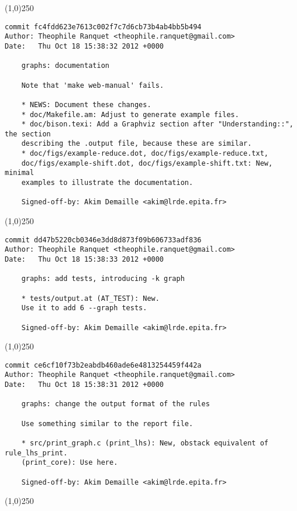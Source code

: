 \line(1,0){250}
\begin{verbatim}
commit fc4fdd623e7613c002f7c7d6cb73b4ab4bb5b494
Author: Theophile Ranquet <theophile.ranquet@gmail.com>
Date:   Thu Oct 18 15:38:32 2012 +0000

    graphs: documentation
    
    Note that 'make web-manual' fails.
    
    * NEWS: Document these changes.
    * doc/Makefile.am: Adjust to generate example files.
    * doc/bison.texi: Add a Graphviz section after "Understanding::", the section
    describing the .output file, because these are similar.
    * doc/figs/example-reduce.dot, doc/figs/example-reduce.txt,
    doc/figs/example-shift.dot, doc/figs/example-shift.txt: New, minimal
    examples to illustrate the documentation.
    
    Signed-off-by: Akim Demaille <akim@lrde.epita.fr>

\end{verbatim}
\line(1,0){250}
\begin{verbatim}
commit dd47b5220cb0346e3dd8d873f09b606733adf836
Author: Theophile Ranquet <theophile.ranquet@gmail.com>
Date:   Thu Oct 18 15:38:33 2012 +0000

    graphs: add tests, introducing -k graph
    
    * tests/output.at (AT_TEST): New.
    Use it to add 6 --graph tests.
    
    Signed-off-by: Akim Demaille <akim@lrde.epita.fr>

\end{verbatim}
\line(1,0){250}
\begin{verbatim}
commit ce6cf10f73b2eabdb460ade6e4813254459f442a
Author: Theophile Ranquet <theophile.ranquet@gmail.com>
Date:   Thu Oct 18 15:38:31 2012 +0000

    graphs: change the output format of the rules
    
    Use something similar to the report file.
    
    * src/print_graph.c (print_lhs): New, obstack equivalent of rule_lhs_print.
    (print_core): Use here.
    
    Signed-off-by: Akim Demaille <akim@lrde.epita.fr>

\end{verbatim}
\line(1,0){250}
